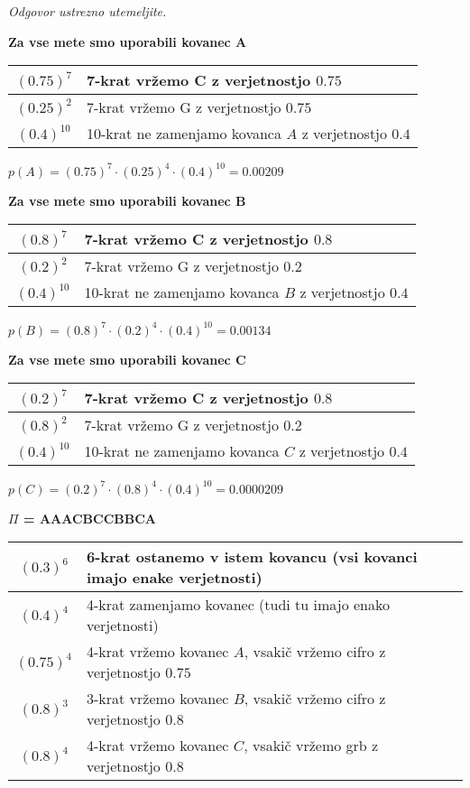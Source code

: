\documentclass{article}
\begin{document}
\begin{enumerate}
		\textit{Odgovor ustrezno utemeljite.}

		\textbf{Za vse mete smo uporabili kovanec A}

		\begin{tabular}{c||l}
			$(0.75)^7$ & 7-krat vržemo C z verjetnostjo $0.75$ \\
			\hline
			$(0.25)^2$ & 7-krat vržemo G z verjetnostjo $0.75$ \\
			\hline
			$(0.4)^{10}$ & 10-krat ne zamenjamo kovanca $A$ z verjetnostjo $0.4$
		\end{tabular}

		\begin{center}
			$p(A) = (0.75)^7 \cdot (0.25)^4 \cdot (0.4)^{10} = 0.00209$
		\end{center}

		\textbf{Za vse mete smo uporabili kovanec B}

		\begin{tabular}{c||l}
			$(0.8)^7$ & 7-krat vržemo C z verjetnostjo $0.8$ \\
			\hline
			$(0.2)^2$ & 7-krat vržemo G z verjetnostjo $0.2$ \\
			\hline
			$(0.4)^{10}$ & 10-krat ne zamenjamo kovanca $B$ z verjetnostjo $0.4$
		\end{tabular}

		\begin{center}
			$p(B) = (0.8)^7 \cdot (0.2)^4 \cdot (0.4)^{10} = 0.00134$
		\end{center}

		\textbf{Za vse mete smo uporabili kovanec C}

		\begin{tabular}{c||l}
			$(0.2)^7$ & 7-krat vržemo C z verjetnostjo $0.8$ \\
			\hline
			$(0.8)^2$ & 7-krat vržemo G z verjetnostjo $0.2$ \\
			\hline
			$(0.4)^{10}$ & 10-krat ne zamenjamo kovanca $C$ z verjetnostjo $0.4$
		\end{tabular}

		\begin{center}
			$p(C) = (0.2)^7 \cdot (0.8)^4 \cdot (0.4)^{10} = 0.0000209$
		\end{center}

		\textbf{$\Pi$ = AAACBCCBBCA}

		\begin{tabular}{c||l}
			$(0.3)^6$ & 6-krat ostanemo v istem kovancu (vsi kovanci imajo enake verjetnosti) \\
			\hline
			$(0.4)^4$ & 4-krat zamenjamo kovanec (tudi tu imajo enako verjetnosti) \\
			\hline
			$(0.75)^4$ & 4-krat vržemo kovanec $A$, vsakič vržemo cifro z verjetnostjo $0.75$ \\
			\hline
			$(0.8)^3$ & 3-krat vržemo kovanec $B$, vsakič vržemo cifro z verjetnostjo $0.8$ \\
			\hline
			$(0.8)^4$ & 4-krat vržemo kovanec $C$, vsakič vržemo grb z verjetnostjo $0.8$
		\end{tabular}


\end{enumerate}
\end{document}
